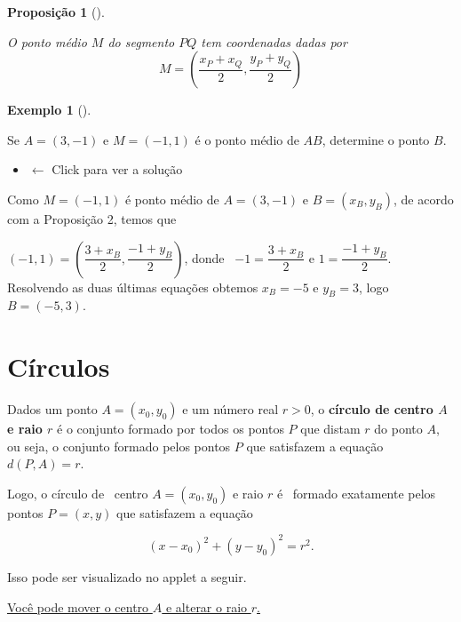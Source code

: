 \documentclass[
  brazilian,
  letterpaper,
  DIV=11,
  numbers=noendperiod]{scrreprt}
\providecommand{\tightlist}{%
  \setlength{\itemsep}{0pt}\setlength{\parskip}{0pt}}
\theoremstyle{definition}
\theoremstyle{plain}
\newtheorem{proposition}{Proposição}[chapter]
\theoremstyle{definition}
\newtheorem{example}{Exemplo}[chapter]
\theoremstyle{remark}
\begin{document}
\begin{proposition}[]\protect\hypertarget{prp-formula-ponto-medio}{}\label{prp-formula-ponto-medio}

O ponto médio \(M\) do segmento \(PQ\) tem coordenadas dadas por
\[ M=\left(\frac{x_P+x_Q}{2},\frac{y_P+y_Q}{2}\right)
\]

\end{proposition}

\begin{example}[]\protect\hypertarget{exm-ponto-medio1}{}\label{exm-ponto-medio1}

Se \(A=\left(3,-1\right)\) e \(M=\left(-1,1\right)\) é o ponto médio de
\(AB\), determine o ponto \(B\).

\begin{itemize}
\tightlist
\item
  \(\leftarrow\) Click para ver a solução
\end{itemize}

Como \(M=(-1,1)\) é ponto médio de \(A=(3,-1)\) e \(B=(x_B,y_B)\), de
acordo com a Proposição 2, temos que

\((-1,1)=\left(\dfrac{3+x_B}{2},\dfrac{-1+y_B}{2}\right)\), donde~
\(-1=\dfrac{3+x_B}{2}\) e \(1=\dfrac{-1+y_B}{2}\). Resolvendo as duas
últimas equações obtemos \(x_B=-5\) e \(y_B=3\), logo \(B=(-5,3)\).

\end{example}


\chapter{Círculos}\label{cuxedrculos}

Dados um ponto \(A=\left(x_0,y_0\right)\) e um número real \(r>0\), o
\textbf{círculo de centro \(A\) e raio \(r\)} é o conjunto formado por
todos os pontos \(P\) que distam \(r\) do ponto \(A\), ou seja, o
conjunto formado pelos pontos \(P\) que satisfazem a equação
\(d\left(P,A\right)=r\).

Logo, o círculo de~ centro \(A=\left(x_0,y_0\right)\) e raio \(r\) é~
formado exatamente pelos pontos \(P=\left(x,y\right)\) que satisfazem a
equação

\[
(x-x_0)^2+(y-y_0)^2=r^2.
\]

Isso pode ser visualizado no applet a seguir.

\href{geogebra/h6vdnv3c}{Você pode mover o centro \(A\) e alterar o raio
\(r\).}
\end{document}
